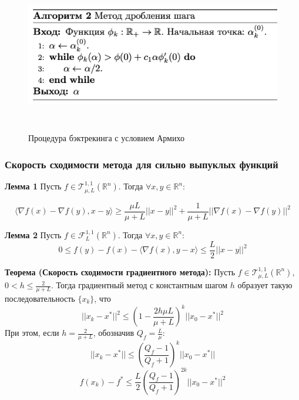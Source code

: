 \begin{enumerate}
    \begin{figure}[H]
            \centering
            \includegraphics[width=16cm, height=6cm]{images/2-3-backtracking.png}
            \label{ris:im225}
            \caption{Процедура бэктрекинга с условием Армихо}
        \end{figure}


\end{enumerate}


\subsubsection{Скорость сходимости метода для сильно выпуклых функций }

{\bf Лемма 1}
Пусть
$f \in \mathscr{T}_{\mu, L}^{1,1}(\mathbb{R}^n)$.
Тогда
$\forall x, y \in \mathbb{R}^n$:

\begin{equation*}
    \langle
         \nabla f(x) - \nabla f(y), x-y
    \rangle
    \geqslant
    \frac{\mu L}{\mu + L} ||x-y||^2 +
    \frac{1}{\mu + L} ||\nabla f(x) - \nabla f(y)||^2
\end{equation*}

{\bf Лемма 2}
Пусть
$f \in \mathscr{F}_{L}^{1,1}(\mathbb{R}^n)$.
Тогда
$\forall x, y \in \mathbb{R}^n$:
\begin{equation*}
    0 \leqslant f(y) - f(x) -
    \langle
         \nabla f(x), y-x
    \rangle
    \leqslant \frac{L}{2} ||x-y||^2
\end{equation*}

{\bf Теорема (Скорость сходимости градиентного метода):}
Пусть
$f \in \mathscr{T}_{\mu, L}^{1,1}(\mathbb{R}^n)$,
$0 < h \leqslant \frac{2}{\mu + L}$.
Тогда градиентный метод с константным шагом $h$ образует такую последовательность
$\{x_k\}$, что
\begin{equation*}
    ||x_k - x^*||^2 \leqslant
    \left(
        1 - \frac{2h\mu L}{\mu + L}
    \right)^k
    ||x_0 - x^*||^2
\end{equation*}
При этом, если $h=\frac{2}{\mu + L}$,
обозначив
$Q_f = \frac{L}{\mu}$:
\begin{equation*}
    ||x_k - x^*|| \leqslant
    \left(
        \frac{Q_f - 1}{Q_f + 1}
    \right)^k
    ||x_0 - x^*||
\end{equation*}
\begin{equation*}
    f(x_k) - f^* \leqslant
    \frac{L}{2}
    \left(
        \frac{Q_f - 1}{Q_f + 1}
    \right)^{2k}
    ||x_0 - x^*||^2
\end{equation*}


